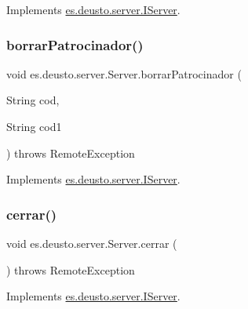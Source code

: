 Implements \mbox{\hyperlink{interfacees_1_1deusto_1_1server_1_1_i_server_ac833d9018ade9c49677942317f270046}{es.\+deusto.\+server.\+I\+Server}}.

\mbox{\label{classes_1_1deusto_1_1server_1_1_server_a0110ad2da18e4867bdc3321fb3871f7a}} 
\subsubsection{\texorpdfstring{borrarPatrocinador()}{borrarPatrocinador()}}
{\footnotesize\ttfamily void es.\+deusto.\+server.\+Server.\+borrar\+Patrocinador (\begin{DoxyParamCaption}\item[{String}]{cod,  }\item[{String}]{cod1 }\end{DoxyParamCaption}) throws Remote\+Exception}



Implements \mbox{\hyperlink{interfacees_1_1deusto_1_1server_1_1_i_server_a14b52d5f2c1410736c6d74c65a479813}{es.\+deusto.\+server.\+I\+Server}}.

\mbox{\label{classes_1_1deusto_1_1server_1_1_server_a14279d26e3b3cd38e1615f99b6c6899f}} 
\subsubsection{\texorpdfstring{cerrar()}{cerrar()}}
{\footnotesize\ttfamily void es.\+deusto.\+server.\+Server.\+cerrar (\begin{DoxyParamCaption}{ }\end{DoxyParamCaption}) throws Remote\+Exception}



Implements \mbox{\hyperlink{interfacees_1_1deusto_1_1server_1_1_i_server_a816dca404c8d1fb6e414a74cbfcdf08e}{es.\+deusto.\+server.\+I\+Server}}.

\mbox{\label{classes_1_1deusto_1_1server_1_1_server_afa3e758715cbf321f9c1cbe08a8583a4}} 
